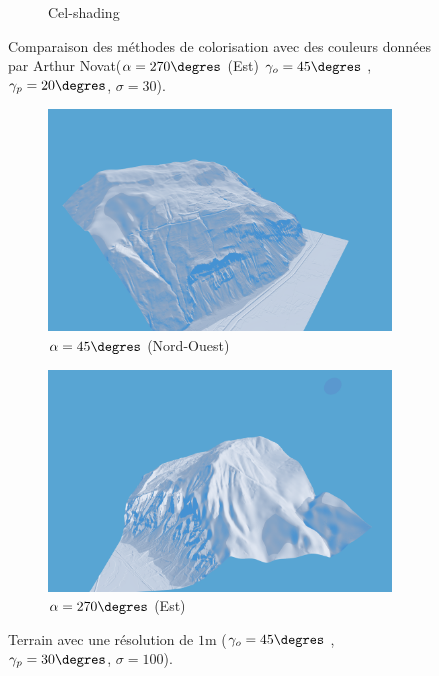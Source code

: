 \begin{figure}[h!]
\begin{subfigure}[t]{0.32\linewidth}
  \caption{Cel-shading}
 \end{subfigure}
 \caption{\label{fig:colorOmbre} Comparaison des méthodes de colorisation avec des couleurs données par Arthur Novat($\alpha = 270\degres$ (Est) $\gamma_o = 45\degres$ , $\gamma_p = 20\degres$, $\sigma = 30$). }
\end{figure}


\begin{figure}[h!]
\centering
 \begin{subfigure}[t]{0.49\linewidth}
   \centering
   \includegraphics[width=1.0\linewidth]{Resultats/7_high_1.png}
   \caption{$\alpha = 45\degres$ (Nord-Ouest)}
 \end{subfigure}
 \begin{subfigure}[t]{0.49\linewidth}
   \centering
   \includegraphics[width=1.0\linewidth]{Resultats/7_high_2.png}
   \caption{$\alpha = 270\degres$ (Est)}
 \end{subfigure}
 \caption{Terrain avec une résolution de $1$m ($\gamma_o = 45\degres$ , $\gamma_p = 30\degres$, $\sigma = 100$).}
\end{figure}

